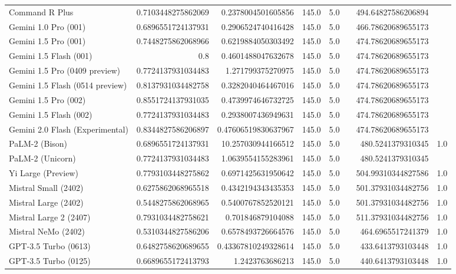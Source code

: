 \begin{table}[htp]
{\begin{tabular}{lrrrrrrr}
Command R Plus & 0.7103448275862069 & 0.2378004501605856 & 145.0 & 5.0 &  & 494.64827586206894 &  \\
Gemini 1.0 Pro (001) & 0.6896551724137931 & 0.2906524740416428 & 145.0 & 5.0 &  & 466.78620689655173 &  \\
Gemini 1.5 Pro (001) & 0.7448275862068966 & 0.6219884050303492 & 145.0 & 5.0 &  & 474.78620689655173 &  \\
Gemini 1.5 Flash (001) & 0.8 & 0.4601488047632678 & 145.0 & 5.0 &  & 474.78620689655173 &  \\
Gemini 1.5 Pro (0409 preview) & 0.7724137931034483 & 1.271799375270975 & 145.0 & 5.0 &  & 474.78620689655173 &  \\
Gemini 1.5 Flash (0514 preview) & 0.8137931034482758 & 0.3282040464467016 & 145.0 & 5.0 &  & 474.78620689655173 &  \\
Gemini 1.5 Pro (002) & 0.8551724137931035 & 0.4739974646732725 & 145.0 & 5.0 &  & 474.78620689655173 &  \\
Gemini 1.5 Flash (002) & 0.7724137931034483 & 0.2938007436949631 & 145.0 & 5.0 &  & 474.78620689655173 &  \\
Gemini 2.0 Flash (Experimental) & 0.8344827586206897 & 0.47606519830637967 & 145.0 & 5.0 &  & 474.78620689655173 &  \\
PaLM-2 (Bison) & 0.6896551724137931 & 10.257030944166512 & 145.0 & 5.0 &  & 480.5241379310345 & 1.0 \\
PaLM-2 (Unicorn) & 0.7724137931034483 & 1.0639554155283961 & 145.0 & 5.0 &  & 480.5241379310345 &  \\
Yi Large (Preview) & 0.7793103448275862 & 0.6971425631950642 & 145.0 & 5.0 &  & 504.99310344827586 & 1.0 \\
Mistral Small (2402) & 0.6275862068965518 & 0.4342194343435353 & 145.0 & 5.0 &  & 501.37931034482756 & 1.0 \\
Mistral Large (2402) & 0.5448275862068965 & 0.5400767852520121 & 145.0 & 5.0 &  & 501.37931034482756 & 1.0 \\
Mistral Large 2 (2407) & 0.7931034482758621 & 0.701846879104088 & 145.0 & 5.0 &  & 511.37931034482756 & 1.0 \\
Mistral NeMo (2402) & 0.5310344827586206 & 0.6578493726664576 & 145.0 & 5.0 &  & 464.6965517241379 & 1.0 \\
GPT-3.5 Turbo (0613) & 0.6482758620689655 & 0.43367810249328614 & 145.0 & 5.0 &  & 433.6413793103448 & 1.0 \\
GPT-3.5 Turbo (0125) & 0.6689655172413793 & 1.2423763686213 & 145.0 & 5.0 &  & 440.6413793103448 & 1.0 \\

\end{tabular}}
\end{table}
